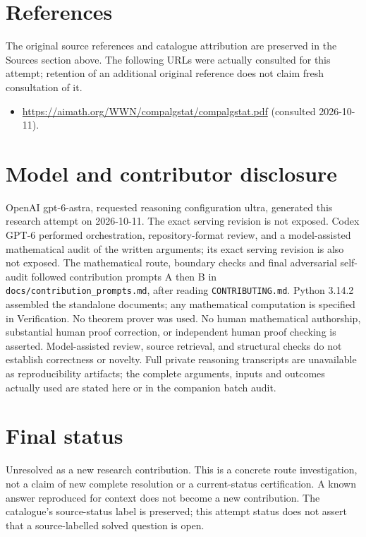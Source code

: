\documentclass[11pt]{article}
\begin{document}
\section{References}
The original source references and catalogue attribution are preserved in the
Sources section above. The following URLs were actually consulted for this attempt;
retention of an additional original reference does not claim fresh consultation of it.
\begin{itemize}
\item \url{https://aimath.org/WWN/compalgstat/compalgstat.pdf} (consulted 2026-10-11). 
\end{itemize}
\section{Model and contributor disclosure}
OpenAI gpt-6-astra, requested reasoning configuration ultra, generated this research
attempt on 2026-10-11. The exact serving revision is not exposed. Codex GPT-6
performed orchestration, repository-format review, and a model-assisted mathematical
audit of the written arguments; its exact serving revision
is also not exposed. The mathematical route, boundary checks and final adversarial
self-audit followed contribution prompts A then B in
\texttt{docs/contribution\_prompts.md}, after reading \texttt{CONTRIBUTING.md}.
Python 3.14.2 assembled the standalone documents; any mathematical computation is
specified in Verification. No theorem prover was used. No human mathematical
authorship, substantial human proof correction, or independent human proof checking
is asserted. Model-assisted review, source retrieval, and structural checks do not
establish correctness or novelty. Full private reasoning transcripts are unavailable
as reproducibility artifacts; the complete arguments, inputs and outcomes actually
used are stated here or in the companion batch audit.
\section{Final status}
Unresolved as a new research contribution. This is a concrete route investigation,
not a claim of new complete resolution or a current-status certification. A known
answer reproduced for context does not become a new contribution. The catalogue's
source-status label is preserved; this attempt status does not assert that a
source-labelled solved question is open.
\end{document}
